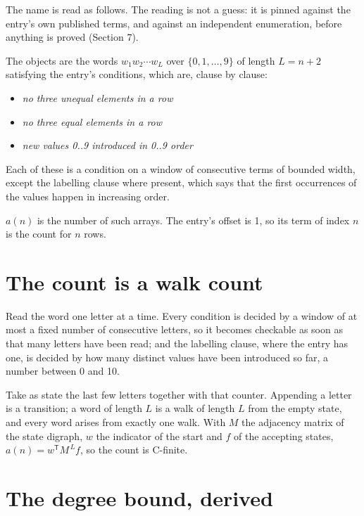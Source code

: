 \documentclass[11pt]{article}
\theoremstyle{definition}
\begin{document}
The name is read as follows. The reading is not a guess: it is pinned against the entry's own published terms, and against an independent enumeration, before anything is proved (Section 7).

The objects are the words $w_1 w_2 \cdots w_L$ over $\{0,1,\dots,9\}$ of length $L = n + 2$ satisfying the entry's conditions, which are, clause by clause:

\begin{itemize}

\item {\itshape no three unequal elements in a row}

\item {\itshape no three equal elements in a row}

\item {\itshape new values 0..9 introduced in 0..9 order}

\end{itemize}

Each of these is a condition on a window of consecutive terms of bounded width, except the labelling clause where present, which says that the first occurrences of the values happen in increasing order.

$a(n)$ is the number of such arrays. The entry's offset is 1, so its term of index $n$ is the count for $n$ rows.

\section{The count is a walk count}

Read the word one letter at a time. Every condition is decided by a window of at most a fixed number of consecutive letters, so it becomes checkable as soon as that many letters have been read; and the labelling clause, where the entry has one, is decided by how many distinct values have been introduced so far, a number between $0$ and 10.

Take as state the last few letters together with that counter. Appending a letter is a transition; a word of length $L$ is a walk of length $L$ from the empty state, and every word arises from exactly one walk. With $M$ the adjacency matrix of the state digraph, $w$ the indicator of the start and $f$ of the accepting states, $a(n) = w^{\mathsf T}M^{\,L}f$, so the count is C-finite.

\section{The degree bound, derived}
\end{document}

